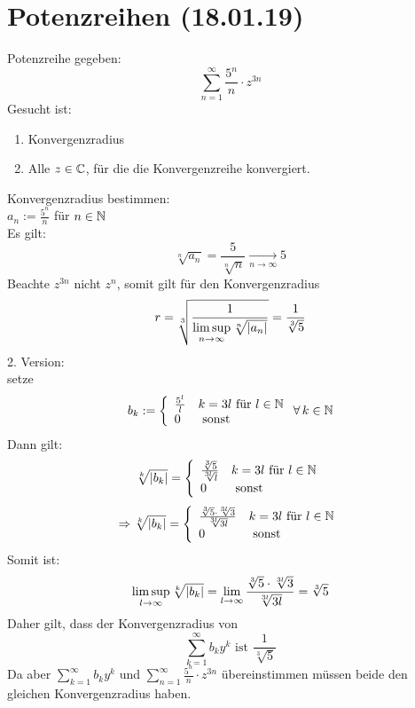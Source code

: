 \documentclass[../ana1u.tex]{subfiles}
\begin{document}
\setcounter{section}{9}

\section{Potenzreihen (18.01.19)}
\begin{bsp}
    Potenzreihe gegeben:
    \[ \sum_{n=1}^{\infty} \frac{5^n}{n} \cdot z^{3n} \]
    Gesucht ist:
    \begin{enumerate}
        \item Konvergenzradius
        \item Alle \( z \in \mathbb{C} \), für die die Konvergenzreihe konvergiert.
    \end{enumerate}
    Konvergenzradius bestimmen: \\
    \(a_n := \frac{5^n}{n} \) für \(n \in \mathbb{N} \) \\
    Es gilt: 
    \[ \sqrt[n]{a_n} = \frac{5}{\sqrt[n]{n}} \underset{n \rightarrow \infty}{\longrightarrow} 5 \]
    Beachte \(z^{3n} \) nicht \(z^n \), somit gilt für den Konvergenzradius
    \[r = \sqrt[3]{\frac{1}{\limsup\limits_{n\rightarrow\infty}\sqrt[n]{|a_n|}}} = \frac{1}{\sqrt[3]{5}} \]
    2. Version: \\
    setze
    \[b_k := \left\{
        \begin{array}{ll}
        \frac{5^l}{l} & k = 3l \text{ für } l \in \mathbb{N} \\
        0 & \text{ sonst}
        \end{array}
        \right.  \forall \, k \in \mathbb{N} \]
    Dann gilt:
    \[\sqrt[k]{|b_k|} = \left\{
        \begin{array}{ll}
        \frac{\sqrt[3]{5}}{\sqrt[3l]{l}} & k = 3l \text{ für } l \in \mathbb{N} \\
        0 & \text{ sonst}
        \end{array}
        \right. \]
    \[\Rightarrow \sqrt[k]{|b_k|} = \left\{
        \begin{array}{ll}
        \frac{\sqrt[3]{5} \cdot \sqrt[3l]{3}}{\sqrt[3l]{3l}} & k = 3l \text{ für } l \in \mathbb{N} \\
        0 & \text{ sonst}
        \end{array}
        \right. \]
    Somit ist:
    \[\limsup\limits_{l\rightarrow\infty} \sqrt[k]{|b_k|} = \lim\limits_{l\rightarrow\infty} \frac{\sqrt[3]{5} \cdot \sqrt[3l]{3}}{\sqrt[3l]{3l}} = \sqrt[3]{5} \]
    Daher gilt, dass der Konvergenzradius von 
    \[\sum_{k=1}^{\infty} b_k y^k \text{ ist } \frac{1}{\sqrt[3]{5}}\]
    Da aber \(\sum_{k=1}^{\infty} b_k y^k \) und \(\sum_{n=1}^{\infty} \frac{5^n}{n} \cdot z^{3n} \) übereinstimmen
    müssen beide den gleichen Konvergenzradius haben.
\end{bsp}
\end{document}
